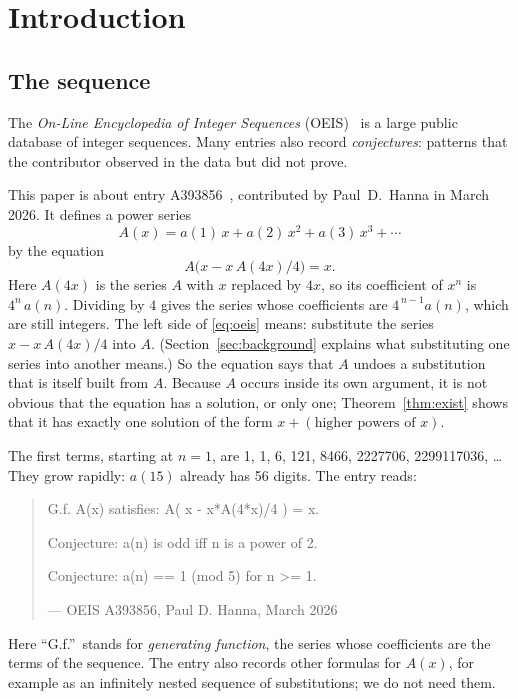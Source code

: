 \documentclass[11pt,a4paper]{article}
\theoremstyle{definition}
\theoremstyle{remark}
\begin{document}
\section{Introduction}

\subsection{The sequence}\label{sec:sequence}
The \emph{On-Line Encyclopedia of Integer Sequences} (OEIS)~\cite{oeisdb} is a large public database of integer
sequences. Many
entries also record \emph{conjectures}: patterns that the contributor observed in the data but did not prove.

This paper is about entry A393856~\cite{oeis}, contributed by Paul~D.~Hanna in March 2026. It defines a power series
\[
A(x)=a(1)\,x+a(2)\,x^2+a(3)\,x^3+\cdots
\]
by the equation
\begin{equation}\label{eq:oeis}
A\bigl(x-x\,A(4x)/4\bigr)=x.
\end{equation}
Here $A(4x)$ is the series $A$ with $x$ replaced by $4x$, so its coefficient of $x^n$ is
$4^n\,a(n)$. Dividing by $4$ gives the series whose coefficients are
$4^{\,n-1}a(n)$, which are still integers. The left side of \eqref{eq:oeis} means: substitute the series
$x-x\,A(4x)/4$ into $A$. (Section~\ref{sec:background} explains what substituting one
series into another means.) So the equation says that $A$ undoes a substitution that is itself built from $A$. Because
$A$ occurs inside its own argument, it is not obvious that the equation has a solution, or only one; Theorem~\ref{thm:exist}
shows that it has exactly one solution of the form $x+(\text{higher powers of }x)$.

The first terms, starting at $n=1$, are 1, 1, 6, 121, 8466, 2227706, 2299117036, \dots{} They grow rapidly: $a(15)$
already has 56 digits. The entry reads:
\begin{quote}\small\ttfamily\raggedright G.f. A(x) satisfies: A( x - x*A(4*x)/4 ) = x.\par\smallskip Conjecture: a(n) is odd iff n is a power of 2.\par\smallskip Conjecture: a(n) == 1 (mod 5) for n >= 1.\par\smallskip\hfill\textrm{--- OEIS A393856, Paul D. Hanna, March 2026}\end{quote}

Here ``G.f.''\ stands for \emph{generating function}, the series whose coefficients are the terms of the sequence.
The entry also records other formulas for $A(x)$, for example as an infinitely nested sequence of substitutions; we do
not need them.
\end{document}
